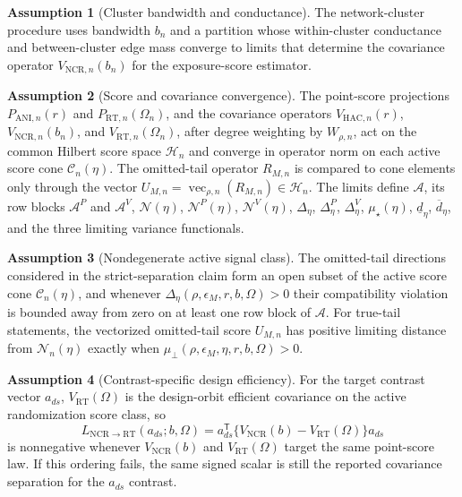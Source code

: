 \documentclass[11pt]{article}
\newcommand{\transpose}{\mathsf{T}}
\theoremstyle{definition}
\newtheorem{assumption}{Assumption}
\theoremstyle{plain}
\theoremstyle{remark}
\begin{document}
\begin{assumption}[Cluster bandwidth and conductance]\label{ass:cluster-bandwidth}
The network-cluster procedure uses bandwidth \(b_n\) and a partition whose
within-cluster conductance and between-cluster edge mass converge to limits
that determine the covariance operator \(V_{\mathrm{NCR},n}(b_n)\) for the
exposure-score estimator.
\end{assumption}

\begin{assumption}[Score and covariance convergence]\label{ass:kernel-convergence}
The point-score projections \(P_{\mathrm{ANI},n}(r)\) and
\(P_{\mathrm{RT},n}(\Omega_n)\), and the covariance operators
\(V_{\mathrm{HAC},n}(r)\), \(V_{\mathrm{NCR},n}(b_n)\), and
\(V_{\mathrm{RT},n}(\Omega_n)\), after degree weighting by \(W_{\rho,n}\),
act on the common Hilbert score space \(\mathcal H_n\) and converge in
operator norm on each active score cone \(\mathcal C_n(\eta)\).  The
omitted-tail operator \(R_{M,n}\) is compared to cone elements only through the
vector \(U_{M,n}=\operatorname{vec}_{\rho,n}(R_{M,n})\in\mathcal H_n\).  The
limits define \(\mathcal A\), its row blocks \(\mathcal A^P\) and
\(\mathcal A^V\), \(\mathcal N(\eta)\), \(\mathcal N^P(\eta)\),
\(\mathcal N^V(\eta)\), \(\Delta_\eta\), \(\Delta^P_\eta\),
\(\Delta^V_\eta\), \(\mu_\star(\eta)\), \(\underline d_\eta\),
\(\overline d_\eta\), and the three limiting variance functionals.
\end{assumption}

\begin{assumption}[Nondegenerate active signal class]\label{ass:nondegenerate-signal}
The omitted-tail directions considered in the strict-separation claim form an
open subset of the active score cone \(\mathcal C_n(\eta)\), and whenever
\(\Delta_\eta(\rho,\epsilon_M,r,b,\Omega)>0\) their compatibility violation is
bounded away from zero on at least one row block of \(\mathcal A\).  For
true-tail statements, the vectorized omitted-tail score \(U_{M,n}\) has
positive limiting distance from \(\mathcal N_n(\eta)\) exactly when
\(\mu_{\perp}(\rho,\epsilon_M,\eta,r,b,\Omega)>0\).
\end{assumption}

\begin{assumption}[Contrast-specific design efficiency]\label{ass:contrast-efficiency}
For the target contrast vector \(a_{ds}\), \(V_{\mathrm{RT}}(\Omega)\) is the
design-orbit efficient covariance on the active randomization score class, so
\[
  L_{\mathrm{NCR}\to\mathrm{RT}}(a_{ds};b,\Omega)
  =
  a_{ds}^{\transpose}\{V_{\mathrm{NCR}}(b)-V_{\mathrm{RT}}(\Omega)\}a_{ds}
\]
is nonnegative whenever \(V_{\mathrm{NCR}}(b)\) and
\(V_{\mathrm{RT}}(\Omega)\) target the same point-score law.  If this ordering
fails, the same signed scalar is still the reported covariance separation for
the \(a_{ds}\) contrast.
\end{assumption}
\end{document}
